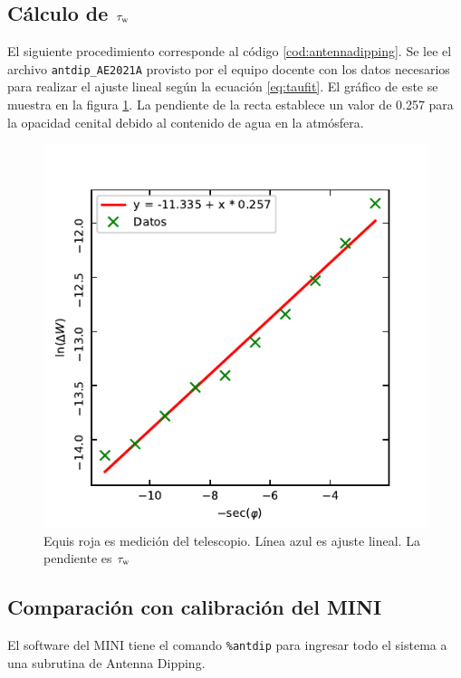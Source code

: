 \subsection{Cálculo de $\tau_\textnormal{w}$}

El siguiente procedimiento corresponde al código \ref{cod:antennadipping}. Se lee el archivo \texttt{antdip\_AE2021A} provisto por el equipo docente con los datos necesarios para realizar el ajuste lineal según la ecuación \ref{eq:taufit}. El gráfico de este se muestra en la figura \ref{fig:taufit}. La pendiente de la recta establece un valor de \num{0.257} para la opacidad cenital debido al contenido de agua en la atmósfera.

\begin{figure}[p]
	\centering
	\includegraphics{rsc/taufit.pdf}
	\caption{Equis roja es medición del telescopio. Línea azul es ajuste lineal. La pendiente es $\tau_\textnormal{w}$}
	\label{fig:taufit}
\end{figure}

\subsection{Comparación con calibración del MINI}

El software del MINI tiene el comando \texttt{\%antdip} para ingresar todo el sistema a una subrutina de Antenna Dipping.

